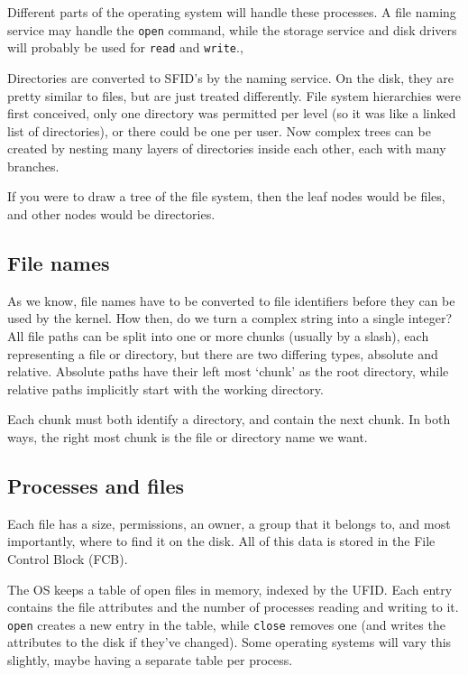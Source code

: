 Different parts of the operating system will handle these processes. A file
naming service may handle the \texttt{open} command, while the storage service
and disk drivers will probably be used for \texttt{read} and \texttt{write}.,

Directories are converted to SFID's by the naming service. On the disk, they are
pretty similar to files, but are just treated differently. File system
hierarchies were first conceived, only one directory was permitted per level (so
it was like a linked list of directories), or there could be one per user. Now
complex trees can be created by nesting many layers of directories inside each
other, each with many branches.

If you were to draw a tree of the file system, then the leaf nodes would be
files, and other nodes would be directories.

\subsection{File names}


As we know, file names have to be converted to file identifiers before they can
be used by the kernel. How then, do we turn a complex string into a single
integer? All file paths can be split into one or more chunks (usually by a
slash), each representing a file or directory, but there are two differing
types, absolute and relative. Absolute paths have their left most `chunk' as the
root directory, while relative paths implicitly start with the working
directory. 

Each chunk must both identify a directory, and contain the next chunk. In both
ways, the right most chunk is the file or directory name we want.

\subsection{Processes and files}

Each file has a size, permissions, an owner, a group that it belongs to, and
most importantly, where to find it on the disk. All of this data is stored in
the File Control Block (FCB).

The OS keeps a table of open files in memory, indexed by the UFID. Each entry
contains the file attributes and the number of processes reading and writing to
it. \texttt{open} creates a new entry in the table, while \texttt{close} removes
one (and writes the attributes to the disk if they've changed). Some operating
systems will vary this slightly, maybe having a separate table per process.

